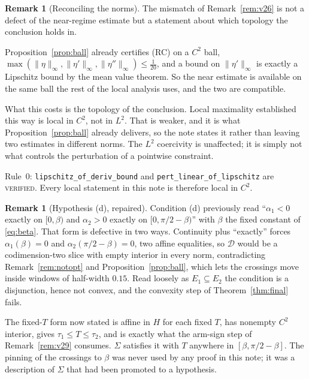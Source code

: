 \documentclass[11pt]{article}
\theoremstyle{definition}
\newtheorem{remark}[theorem]{Remark}
\newcommand{\Sig}{\Sigma}
\begin{document}
\begin{remark}[Reconciling the norms]\label{rem:v27}
The mismatch of Remark~\ref{rem:v26} is not a defect of the near-regime estimate but a
statement about which topology the conclusion holds in.

Proposition~\ref{prop:ball} already certifies (RC) on a $C^2$ ball,
$\max(\|\eta\|_\infty,\|\eta'\|_\infty,\|\eta''\|_\infty)\le\tfrac1{20}$, and a bound on
$\|\eta'\|_\infty$ is exactly a Lipschitz bound by the mean value theorem. So the near
estimate is available on the same ball the rest of the local analysis uses, and the two are
compatible.

What this costs is the topology of the conclusion. Local maximality established this way is
local in $C^2$, not in $L^2$. That is weaker, and it is what Proposition~\ref{prop:ball}
already delivers, so the note states it rather than leaving two estimates in different norms.
The $L^2$ coercivity is unaffected; it is simply not what controls the perturbation of a
pointwise constraint.

Rule~0: \verb|lipschitz_of_deriv_bound| and \verb|pert_linear_of_lipschitz| are
\textsc{verified}. Every local statement in this note is therefore local in $C^2$.
\end{remark}

\begin{remark}[Hypothesis (d), repaired]\label{rem:v28}
Condition (d) previously read ``$\alpha_1<0$ exactly on $[0,\beta)$ and $\alpha_2>0$ exactly on
$[0,\pi/2-\beta)$'' with $\beta$ the fixed constant of \eqref{eq:beta}. That form is defective
in two ways. Continuity plus ``exactly'' forces $\alpha_1(\beta)=0$ and $\alpha_2(\pi/2-\beta)=0$,
two affine equalities, so $\mathcal D$ would be a codimension-two slice with empty interior in
every norm, contradicting Remark~\ref{rem:notopt} and Proposition~\ref{prop:ball}, which lets
the crossings move inside windows of half-width $0.15$. Read loosely as $E_1\subseteq E_2$ the
condition is a disjunction, hence not convex, and the convexity step of
Theorem~\ref{thm:final} fails.

The fixed-$T$ form now stated is affine in $H$ for each fixed $T$, has nonempty $C^2$ interior,
gives $\tau_1\le T\le\tau_2$, and is exactly what the arm-sign step of Remark~\ref{rem:v29}
consumes. $\Sig$ satisfies it with $T$ anywhere in $[\beta,\pi/2-\beta]$. The pinning of the
crossings to $\beta$ was never used by any proof in this note; it was a description of $\Sig$
that had been promoted to a hypothesis.
\end{remark}
\end{document}
